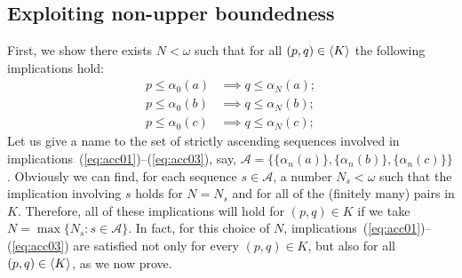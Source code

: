 \subsection{Exploiting non-upper boundedness}
First, we show there exists $N < \omega$ such that 
for all $(p, q) \in \langle K\rangle$ 
the following implications hold:
\begin{align}
  p \leq \alpha_0(a) &\implies q \leq \alpha_N(a); \label{eq:acc01}\\
  p \leq \alpha_0(b) &\implies q \leq \alpha_N(b); \label{eq:acc02}\\ 
  p \leq \alpha_0(c) &\implies q \leq \alpha_N(c); \label{eq:acc03}
\end{align}
Let us give a name to the set of strictly ascending 
sequences involved in implications~(\ref{eq:acc01})--(\ref{eq:acc03}), say, 
$\mathcal A = \{\{\alpha_n(a)\}, \{\alpha_n(b)\}, \{\alpha_n(c)\}\}$. %
Obviously we can find, for each sequence $s \in \mathcal A$, %
a number $N_s < \omega$ such that the implication involving $s$
holds for $N = N_s$ and for all of the (finitely many) pairs in $K$.  
Therefore, all of these implications will hold for $(p, q) \in K$ if we take 
$N = \max \{N_{s} : s \in \mathcal A\}$. %
In fact, for this choice of $N$, implications~(\ref{eq:acc01})--(\ref{eq:acc03}) 
are satisfied not only for every $(p, q) \in K$, but also for all $(p, q) \in \langle K\rangle$,
as we now prove.

